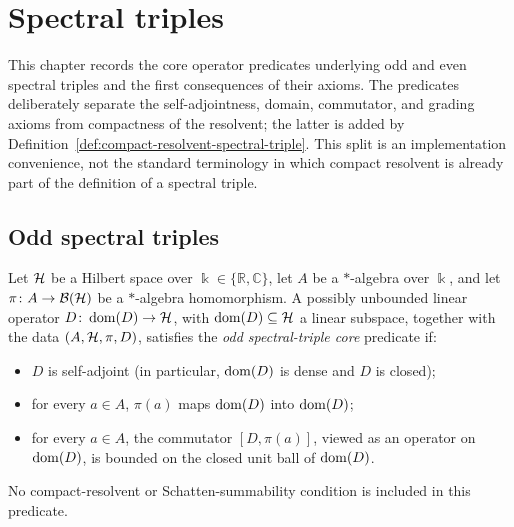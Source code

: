 %

\chapter{Spectral triples}
\label{cha:spectral-triples}

This chapter records the core operator predicates underlying odd and even spectral triples
and the first consequences of their axioms.  The predicates deliberately separate the
self-adjointness, domain, commutator, and grading axioms from compactness of the resolvent;
the latter is added by Definition~\ref{def:compact-resolvent-spectral-triple}.  This split is
an implementation convenience, not the standard terminology in which compact resolvent is
already part of the definition of a spectral triple.

\section{Odd spectral triples}
\label{sec:odd-spectral-triples}

\begin{definition}
  \label{def:odd-spectral-triple}
  \leanok
  Let $\mathcal{H}$ be a Hilbert space over $\Bbbk \in \{\mathbb{R}, \mathbb{C}\}$, let $A$ be a
  $*$-algebra over $\Bbbk$, and let $\pi \colon A \to \mathcal{B}(\mathcal{H})$ be a
  $*$-algebra homomorphism. A possibly unbounded linear operator
  $D \colon \operatorname{dom}(D) \to \mathcal{H}$, with $\operatorname{dom}(D) \subseteq \mathcal{H}$ a linear subspace,
  together with the data $(A, \mathcal{H}, \pi, D)$, satisfies the \emph{odd spectral-triple core}
  predicate if:
  \begin{itemize}
    \item $D$ is self-adjoint (in particular, $\operatorname{dom}(D)$ is dense and $D$ is closed);
    \item for every $a \in A$, $\pi(a)$ maps $\operatorname{dom}(D)$ into $\operatorname{dom}(D)$;
    \item for every $a \in A$, the commutator $[D, \pi(a)]$, viewed as an operator on
      $\operatorname{dom}(D)$, is bounded on the closed unit ball of $\operatorname{dom}(D)$.
  \end{itemize}
  No compact-resolvent or Schatten-summability condition is included in this predicate.
\end{definition}

